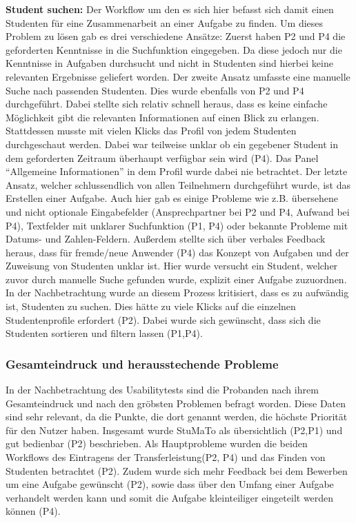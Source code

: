 \documentclass[
  12pt,
  ngerman,
  a4paper,
]{article}
\begin{document}
\textbf{Student suchen:} Der Workflow um den es sich hier befasst sich
damit einen Studenten für eine Zusammenarbeit an einer Aufgabe zu
finden. Um dieses Problem zu lösen gab es drei verschiedene Ansätze:
Zuerst haben P2 und P4 die geforderten Kenntnisse in die Suchfunktion
eingegeben. Da diese jedoch nur die Kenntnisse in Aufgaben durchsucht
und nicht in Studenten sind hierbei keine relevanten Ergebnisse
geliefert worden. Der zweite Ansatz umfasste eine manuelle Suche nach
passenden Studenten. Dies wurde ebenfalls von P2 und P4 durchgeführt.
Dabei stellte sich relativ schnell heraus, dass es keine einfache
Möglichkeit gibt die relevanten Informationen auf einen Blick zu
erlangen. Stattdessen musste mit vielen Klicks das Profil von jedem
Studenten durchgeschaut werden. Dabei war teilweise unklar ob ein
gegebener Student in dem geforderten Zeitraum überhaupt verfügbar sein
wird (P4). Das Panel ``Allgemeine Informationen'' in dem Profil wurde
dabei nie betrachtet. Der letzte Ansatz, welcher schlussendlich von
allen Teilnehmern durchgeführt wurde, ist das Erstellen einer Aufgabe.
Auch hier gab es einige Probleme wie z.B. übersehene und nicht optionale
Eingabefelder (Ansprechpartner bei P2 und P4, Aufwand bei P4),
Textfelder mit unklarer Suchfunktion (P1, P4) oder bekannte Probleme mit
Datums- und Zahlen-Feldern. Außerdem stellte sich über verbales Feedback
heraus, dass für fremde/neue Anwender (P4) das Konzept von Aufgaben und
der Zuweisung von Studenten unklar ist. Hier wurde versucht ein Student,
welcher zuvor durch manuelle Suche gefunden wurde, explizit einer
Aufgabe zuzuordnen. In der Nachbetrachtung wurde an diesem Prozess
kritisiert, dass es zu aufwändig ist, Studenten zu suchen. Dies hätte zu
viele Klicks auf die einzelnen Studentenprofile erfordert (P2). Dabei
wurde sich gewünscht, dass sich die Studenten sortieren und filtern
lassen (P1,P4).

\hypertarget{gesamteindruck-und-herausstechende-probleme}{%
\subsubsection{Gesamteindruck und herausstechende
Probleme}\label{gesamteindruck-und-herausstechende-probleme}}

In der Nachbetrachtung des Usabilitytests sind die Probanden nach ihrem
Gesamteindruck und nach den gröbsten Problemen befragt worden. Diese
Daten sind sehr relevant, da die Punkte, die dort genannt werden, die
höchste Priorität für den Nutzer haben. Insgesamt wurde StuMaTo als
übersichtlich (P2,P1) und gut bedienbar (P2) beschrieben. Als
Hauptprobleme wurden die beiden Workflows des Eintragens der
Transferleistung(P2, P4) und das Finden von Studenten betrachtet (P2).
Zudem wurde sich mehr Feedback bei dem Bewerben um eine Aufgabe
gewünscht (P2), sowie dass über den Umfang einer Aufgabe verhandelt
werden kann und somit die Aufgabe kleinteiliger eingeteilt werden können
(P4).
\end{document}
